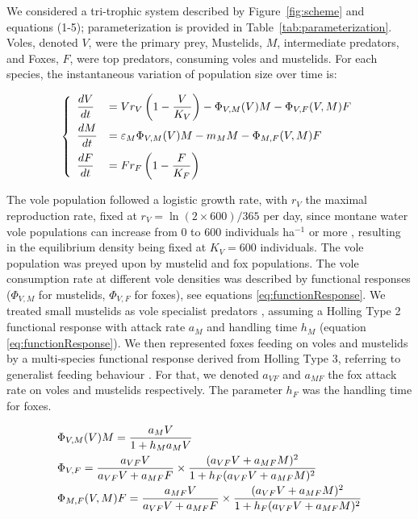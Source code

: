 \documentclass[11pt]{article}
\begin{document}
We considered a tri-trophic system described by Figure~\ref{fig:scheme} and equations (1-5); parameterization is provided in Table~\ref{tab:parameterization}. Voles, denoted $V$, were the primary prey, Mustelids, $M$, intermediate predators, and Foxes, $F$, were top predators, consuming voles and mustelids. For each species, the instantaneous variation of population size over time is:

\begin{equation}
\left\{
\begin{array}{l l}
\dfrac{dV}{dt} & = V r_V \left( 1- \dfrac{V}{K_V}\right) - \Phi_{V,M}(V)M - \Phi_{V,F}(V,M)F\\[.3cm]
%
\dfrac{dM}{dt} & = \varepsilon_M \Phi_{V,M}(V)M - m_M M - \Phi_{M,F}(V,M)F\\[.3cm]
%
\dfrac{dF}{dt} & = F r_F \left( 1- \dfrac{F}{K_F}\right)
\end{array}
\right.
\end{equation}

The vole population followed a logistic growth rate, with $r_V$  the maximal reproduction rate, fixed at $r_V = \ln(2 \times 600)/365$ per day, since montane water vole populations can increase from 0  to  600 individuals ha$^{-1}$ or more \citep{Giraudoux1997}, resulting in the equilibrium density being fixed at $K_V = 600$ individuals. 
%
The vole population was preyed upon by mustelid and fox populations. The vole consumption rate at different vole densities was described by functional responses ($\Phi_{V,M}$ for mustelids, $\Phi_{V,F}$  for foxes), see equations \eqref{eq:functionResponse}.
%
We treated small mustelids as vole specialist predators \citep{King2006}, assuming a Holling Type 2 functional response with attack rate $a_M$ and handling time $h_M$ (equation \eqref{eq:functionResponse}). We then represented foxes feeding on voles and mustelids by a multi-species functional response derived from Holling Type 3, referring to generalist feeding behaviour \citep{Baudrot2016}. For that, we denoted $a_{VF}$ and $a_{MF}$ the fox attack rate on voles and mustelids respectively. The parameter $h_F$ was the handling time for foxes.


\begin{equation}
\begin{array}{l l}
 \Phi_{V,M}(V)M = \dfrac{a_M V}{1 + h_M a_M V} \\[.3cm]
 \Phi_{V,F} = \dfrac{a_{VF} V}{a_{VF}V + a_{MF}F} \times \dfrac{(a_{VF}V + a_{MF} M)^2}{1 + h_F(a_{VF}V + a_{MF} M)^2}\\[.3cm]
  \Phi_{M,F}(V,M)F = \dfrac{a_{MF}V}{a_{VF}V + a_{MF}F} \times \dfrac{(a_{VF}V + a_{MF}M)^2}{1+h_F(a_{VF}V + a_{MF}M)^2}
\end{array}
\label{eq:functionResponse}
\end{equation}
\end{document}
